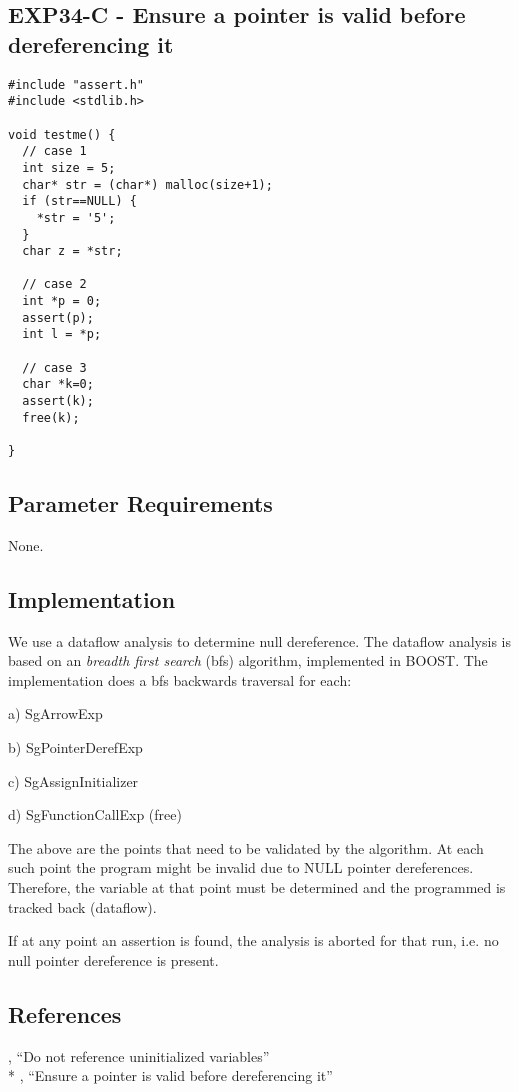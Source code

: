 \subsection{EXP34-C - Ensure a pointer is valid before dereferencing it}
\begin{verbatim}
#include "assert.h"
#include <stdlib.h>

void testme() {
  // case 1
  int size = 5;
  char* str = (char*) malloc(size+1);
  if (str==NULL) {
    *str = '5';
  }
  char z = *str;

  // case 2
  int *p = 0;
  assert(p);
  int l = *p;
  
  // case 3
  char *k=0;
  assert(k);
  free(k);

}
\end{verbatim}

\subsection{Parameter Requirements}

None.

\subsection{Implementation}

We use a dataflow analysis to determine null dereference. The
dataflow analysis is based on an \emph{breadth first search} (bfs) algorithm, implemented in BOOST.
The implementation does a bfs backwards traversal for each:

a) SgArrowExp

b) SgPointerDerefExp

c) SgAssignInitializer

d) SgFunctionCallExp (free)

The above are the points that need to be validated by the algorithm. At each such point
the program might be invalid due to NULL pointer dereferences. Therefore, the variable
at that point must be determined and the programmed is tracked back (dataflow).

If at any point an assertion is found, the analysis is aborted for that run, i.e. 
no null pointer dereference is present.

\subsection{References}

 , ``Do not reference uninitialized variables''\\*
 , ``Ensure a pointer is valid before dereferencing it''



